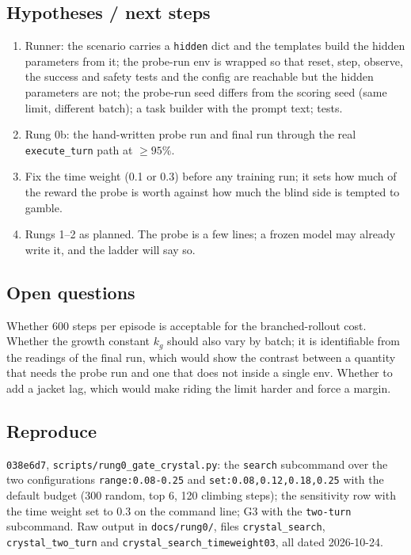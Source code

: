 \documentclass[11pt,a4paper]{article}
\newcommand{\commit}[1]{\texttt{\textcolor{commitgray}{#1}}}
\begin{document}
\subsection*{Hypotheses / next steps}

\begin{enumerate}[nosep]
\item Runner: the scenario carries a \texttt{hidden} dict and the templates
  build the hidden parameters from it; the probe-run env is wrapped so that
  reset, step, observe, the success and safety tests and the config are
  reachable but the hidden parameters are not; the probe-run seed differs
  from the scoring seed (same limit, different batch); a task builder with
  the prompt text; tests.
\item Rung 0b: the hand-written probe run and final run through the real
  \texttt{execute\_turn} path at $\ge 95\%$.
\item Fix the time weight (0.1 or 0.3) before any training run; it sets how
  much of the reward the probe is worth against how much the blind side is
  tempted to gamble.
\item Rungs 1--2 as planned. The probe is a few lines; a frozen model may
  already write it, and the ladder will say so.
\end{enumerate}

\subsection*{Open questions}

Whether 600 steps per episode is acceptable for the branched-rollout cost.
Whether the growth constant $k_g$ should also vary by batch; it is identifiable
from the readings of the final run, which would show the contrast between a
quantity that needs the probe run and one that does not inside a single env.
Whether to add a jacket lag, which would make riding the limit harder and force
a margin.

\subsection*{Reproduce}

\commit{038e6d7}, \texttt{scripts/rung0\_gate\_crystal.py}: the
\texttt{search} subcommand over the two configurations
\texttt{range:0.08-0.25} and \texttt{set:0.08,0.12,0.18,0.25} with the
default budget (300 random, top 6, 120 climbing steps); the sensitivity row
with the time weight set to 0.3 on the command line; G3 with the
\texttt{two-turn} subcommand. Raw output in \texttt{docs/rung0/}, files
\texttt{crystal\_search}, \texttt{crystal\_two\_turn} and
\texttt{crystal\_search\_timeweight03}, all dated 2026-10-24.
\end{document}
